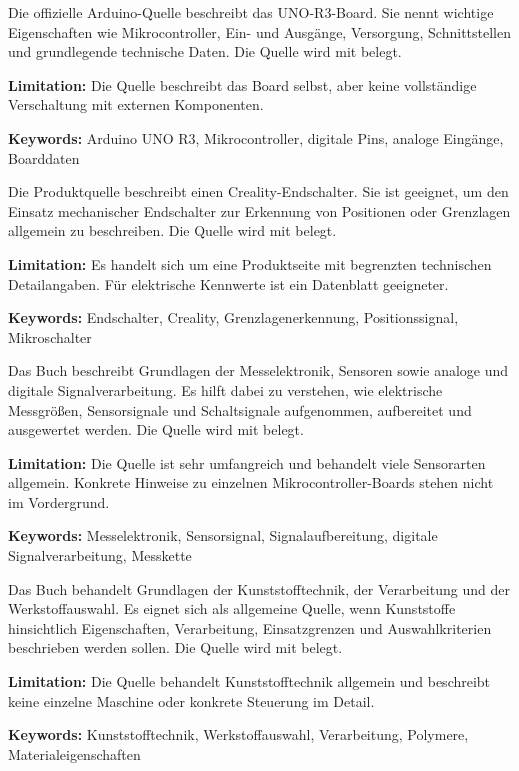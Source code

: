 
{ 
	Die offizielle Arduino-Quelle beschreibt das UNO-R3-Board. Sie nennt wichtige Eigenschaften wie Mikrocontroller, Ein- und Ausgänge, Versorgung, Schnittstellen und grundlegende technische Daten. Die Quelle wird mit \cite{arduino:uno-r3} belegt.
	
	\bigskip
	
	\textbf{Limitation:} Die Quelle beschreibt das Board selbst, aber keine vollständige Verschaltung mit externen Komponenten.
	
	\scriptsize{\textbf{Keywords:} Arduino UNO R3, Mikrocontroller, digitale Pins, analoge Eingänge, Boarddaten}
}



{ 
	Die Produktquelle beschreibt einen Creality-Endschalter. Sie ist geeignet, um den Einsatz mechanischer Endschalter zur Erkennung von Positionen oder Grenzlagen allgemein zu beschreiben. Die Quelle wird mit \cite{bastelgarage:2026} belegt.
	
	\bigskip
	
	\textbf{Limitation:} Es handelt sich um eine Produktseite mit begrenzten technischen Detailangaben. Für elektrische Kennwerte ist ein Datenblatt geeigneter.
	
	\scriptsize{\textbf{Keywords:} Endschalter, Creality, Grenzlagenerkennung, Positionssignal, Mikroschalter}
}



{ 
	Das Buch beschreibt Grundlagen der Messelektronik, Sensoren sowie analoge und digitale Signalverarbeitung. Es hilft dabei zu verstehen, wie elektrische Messgrößen, Sensorsignale und Schaltsignale aufgenommen, aufbereitet und ausgewertet werden. Die Quelle wird mit \cite{Bernstein:2024} belegt.
	
	\bigskip
	
	\textbf{Limitation:} Die Quelle ist sehr umfangreich und behandelt viele Sensorarten allgemein. Konkrete Hinweise zu einzelnen Mikrocontroller-Boards stehen nicht im Vordergrund.
	
	\scriptsize{\textbf{Keywords:} Messelektronik, Sensorsignal, Signalaufbereitung, digitale Signalverarbeitung, Messkette}
}



{ 
	Das Buch behandelt Grundlagen der Kunststofftechnik, der Verarbeitung und der Werkstoffauswahl. Es eignet sich als allgemeine Quelle, wenn Kunststoffe hinsichtlich Eigenschaften, Verarbeitung, Einsatzgrenzen und Auswahlkriterien beschrieben werden sollen. Die Quelle wird mit \cite{Bonnet:2025} belegt.
	
	\bigskip
	
	\textbf{Limitation:} Die Quelle behandelt Kunststofftechnik allgemein und beschreibt keine einzelne Maschine oder konkrete Steuerung im Detail.
	
	\scriptsize{\textbf{Keywords:} Kunststofftechnik, Werkstoffauswahl, Verarbeitung, Polymere, Materialeigenschaften}
}


